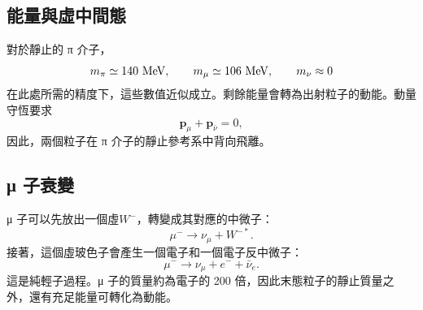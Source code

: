\begin{classroomqa}
\end{classroomqa}

\subsection{能量與虛中間態}

對於靜止的 {\proseunicodefont π} 介子，
\begin{equation}
m_\pi\simeq140\ {\rm MeV},
\qquad
m_\mu\simeq106\ {\rm MeV},
\qquad
m_\nu\approx0
\end{equation}
在此處所需的精度下，這些數值近似成立。剩餘能量會轉為出射粒子的動能。動量守恆要求
\begin{equation}
\boldsymbol p_\mu+\boldsymbol p_{\bar\nu}=0,
\end{equation}
因此，兩個粒子在 {\proseunicodefont π} 介子的靜止參考系中背向飛離。

\begin{classroomqa}
\end{classroomqa}

\subsection{{\proseunicodefont μ} 子衰變}

{\proseunicodefont μ} 子可以先放出一個虛\(W^-\)，轉變成其對應的中微子：
\begin{equation}
\mu^-\longrightarrow\nu_\mu+W^{-*}.
\end{equation}
接著，這個虛玻色子會產生一個電子和一個電子反中微子：
\begin{equation}
\mu^-\longrightarrow
\nu_\mu+e^-+\bar\nu_e.
\label{eq:l5-muon-decay}
\end{equation}
這是純輕子過程。{\proseunicodefont μ} 子的質量約為電子的 200 倍，因此末態粒子的靜止質量之外，還有充足能量可轉化為動能。

